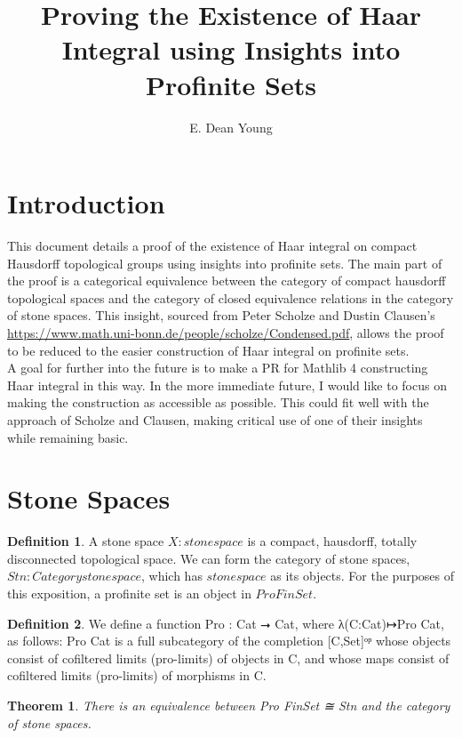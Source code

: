 \documentclass[13pt]{amsart}
\title{Proving the Existence of Haar Integral using Insights into Profinite Sets}
\author{E. Dean Young}
\newtheorem{theorem}{Theorem}
\theoremstyle{definition}
\newtheorem{definition}{Definition}
\begin{document}
\section{Introduction}

This document details a proof of the existence of Haar integral on compact Hausdorff topological groups using insights into profinite sets. The main part of the proof is a categorical equivalence between the category of compact hausdorff topological spaces and the category of closed equivalence relations in the category of stone spaces. This insight, sourced from Peter Scholze and Dustin Clausen's \href{Condensed Mathematics}{https://www.math.uni-bonn.de/people/scholze/Condensed.pdf}, allows the proof to be reduced to the easier construction of Haar integral on profinite sets.\\ 

A goal for further into the future is to make a PR for Mathlib 4 constructing Haar integral in this way. In the more immediate future, I would like to focus on making the construction as accessible as possible. This could fit well with the approach of Scholze and Clausen, making critical use of one of their insights while remaining basic.\\

\section{Stone Spaces}

\begin{definition}
A stone space $X : stonespace$ is a compact, hausdorff, totally disconnected topological space. We can form the category of stone spaces, $Stn : Category stonespace$, which has $stonespace$ as its objects. For the purposes of this exposition, a profinite set is an object in $Pro FinSet$. 
\end{definition}

\begin{definition}
We define a function Pro : Cat ⭢ Cat,  where λ(C:Cat)↦Pro Cat, as follows: Pro Cat is a full subcategory of the completion [C,Set]ᵒᵖ whose objects consist of cofiltered limits (pro-limits) of objects in C, and whose maps consist of cofiltered limits (pro-limits) of morphisms in C.
\end{definition}

\begin{theorem}
There is an equivalence between Pro FinSet ≅ Stn and the category of stone spaces.
\end{theorem}
\end{document}
